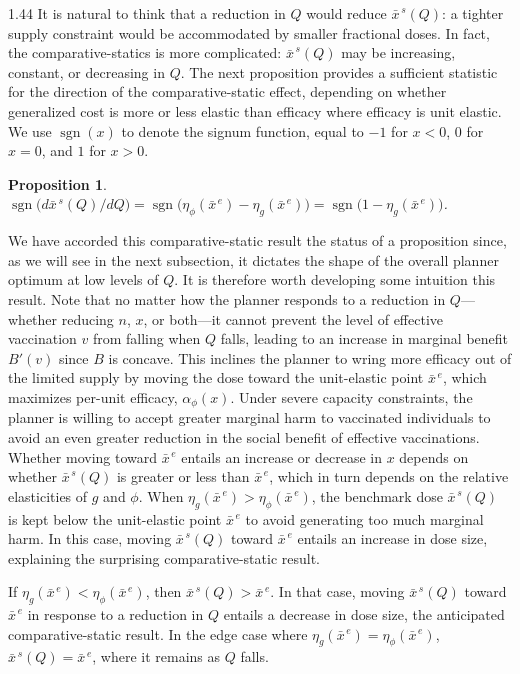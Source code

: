 \documentclass[12pt]{article}
\DeclareMathOperator*{\sgn}{sgn}
\newcommand{\efficacy}{\phi}
\newcommand{\general}{g}
\newcommand{\benefit}{B}
\newcommand{\xshortbar}{\bar{x}^{\,s}}
\newcommand{\xunitbar}{\bar{x}^{\,e}}
\newcommand{\elasticity}[1]{\eta_{#1}}
\newcommand{\perunit}[1]{\alpha_{#1}}
\newtheorem{proposition}{Proposition}
\begin{document}
\begin{spacing}{1.44}
It is natural to think that a reduction in $Q$ would reduce
$\xshortbar\!(Q)$: a tighter supply constraint would be accommodated
by smaller fractional doses. In fact, the comparative-statics is more
complicated: $\xshortbar\!(Q)$ may be increasing, constant, or
decreasing in $Q$. The next proposition provides a sufficient
statistic for the direction of the comparative-static effect,
depending on whether generalized cost is more or less elastic than
efficacy where efficacy is unit elastic. We use $\sgn(x)$ to denote the signum function, equal to $-1$ for $x<0$, $0$ for $x=0$, and $1$ for $x>0$. 
\begin{proposition}
\label{p:xshort}
\singlespace
$\sgn \bigl( d \xshortbar\!(Q) /d Q \bigr) = \sgn
\bigl( \elasticity{\efficacy}\!(\xunitbar) -
\elasticity{\general}\!(\xunitbar) \bigr) = \sgn \bigl( 1 -
\elasticity{\general}\!(\xunitbar) \bigr)$.
\end{proposition}

We have accorded this comparative-static result the status of a
proposition since, as we will see in the next subsection, it dictates
the shape of the overall planner optimum at low levels of $Q$. It is
therefore worth developing some intuition this result. Note that no
matter how the planner responds to a reduction in $Q$---whether
reducing $n$, $x$, or both---it cannot prevent the level of effective
vaccination $v$ from falling when $Q$ falls, leading to an increase in
marginal benefit $\benefit' \! (v)$ since $\benefit$ is concave. This
inclines the planner to wring more efficacy out of the limited supply
by moving the dose toward the unit-elastic point $\xunitbar$, which
maximizes per-unit efficacy, $\perunit{\efficacy}\!(x)$. Under severe
capacity constraints, the planner is willing to accept greater
marginal harm to vaccinated individuals to avoid an even greater
reduction in the social benefit of effective vaccinations. Whether
moving toward $\xunitbar$ entails an increase or decrease in $x$
depends on whether $\xshortbar\!(Q)$ is greater or less than
$\xunitbar$, which in turn depends on the relative elasticities of
$\general$ and $\efficacy$. When $\elasticity{\general}\!(\xunitbar) >
\elasticity{\efficacy}\!(\xunitbar)$, the benchmark dose
$\xshortbar\!(Q)$ is kept below the unit-elastic point $\xunitbar$ to
avoid generating too much marginal harm. In this case, moving
$\xshortbar\!(Q)$ toward $\xunitbar$ entails an increase in dose size,
explaining the surprising comparative-static result.

If $\elasticity{\general}\!(\xunitbar) <
\elasticity{\efficacy}\!(\xunitbar)$, then $\xshortbar\!(Q) >
\xunitbar$. In that case, moving $\xshortbar\!(Q)$ toward $\xunitbar$
in response to a reduction in $Q$ entails a decrease in dose size, the
anticipated comparative-static result. In the edge case where
$\elasticity{\general}\!(\xunitbar) =
\elasticity{\efficacy}\!(\xunitbar)$, $\xshortbar\!(Q) = \xunitbar$,
where it remains as $Q$ falls.


\end{spacing}
\end{document}
